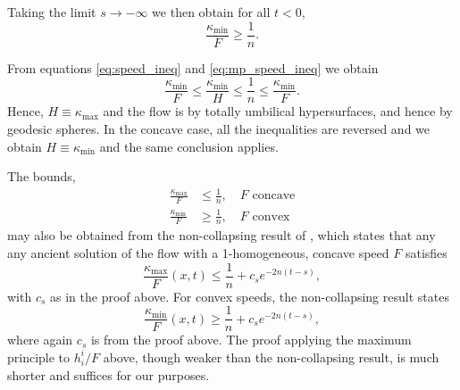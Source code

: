 \documentclass{amsart}
\begin{document}
{Taking the limit $s\to -\infty$ we then obtain for all $t < 0$,
\begin{equation}
\label{eq:mp_speed_ineq}
\frac{\kappa_{\min}}{F} \geq \frac{1}{n}.
\end{equation}

From equations \eqref{eq:speed_ineq} and \eqref{eq:mp_speed_ineq} we obtain
\[
\frac{\kappa_{\min}}{F} \leq \frac{\kappa_{\min}}{H} \leq \frac{1}{n} \leq \frac{\kappa_{\min}}{F}.
\]
Hence, $H\equiv \kappa_{\max}$ and the flow is by totally umbilical hypersurfaces, and hence by geodesic spheres. In the concave case, all the inequalities are reversed and we obtain $H \equiv \kappa_{\min}$ and the same conclusion applies.
}

\begin{rem}
The bounds, 
\[
\begin{split}
\frac{\kappa_{\max}}{F} &\leq \frac{1}{n}, \quad \text{$F$ concave} \\
\frac{\kappa_{\min}}{F} &\geq \frac{1}{n}, \quad \text{$F$ convex}
\end{split}
\]
may also be obtained from the non-collapsing result of \cite[Theorem 1.1]{AndrewsHanLiWei:/2015}, which states that any any ancient solution of the flow with a 1-homogeneous, concave speed $F$ satisfies
\[
\frac{\kappa_{\max}}{F}(x,t) \leq \frac{1}{n}+c_se^{-2n(t-s)},
\]
with \(c_s\) as in the proof above. For convex speeds, the non-collapsing result states
\[
\frac{\kappa_{\min}}{F}(x,t)\geq \frac{1}{n}+c_se^{-2n(t-s)},
\]
where again \(c_s\) is from the proof above. The proof applying the maximum principle to \(h^i_i/F\) above, though weaker than the non-collapsing result, is much shorter and suffices for our purposes.
\end{rem}
\end{document}
